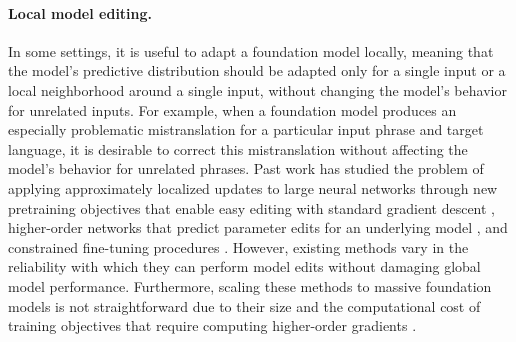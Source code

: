 \paragraph{Local model editing.} In some settings, it is useful to adapt a foundation model locally, meaning that the model's predictive distribution should be adapted only for a single input or a local neighborhood around a single input, without changing the model's behavior for unrelated inputs. For example, when a foundation model produces an especially problematic mistranslation for a particular input phrase and target language, it is desirable to correct this mistranslation without affecting the model's behavior for unrelated phrases. Past work has studied the problem of applying approximately localized updates to large neural networks through new pretraining objectives that enable easy editing with standard gradient descent \citep{sinitsin2020editable}, higher-order networks that predict parameter edits for an underlying model \citep{decao2021editing,mitchell2021model,hase2021language}, and constrained fine-tuning procedures \citep{zhu2020modifying}. However, existing methods vary in the reliability with which they can perform model edits without damaging global model performance. Furthermore, scaling these methods to massive foundation models is not straightforward due to their size and the computational cost of training objectives that require computing higher-order gradients \citep{sinitsin2020editable,decao2021editing,mitchell2021model}.

